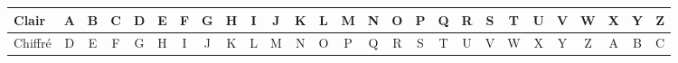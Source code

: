 
\begin{tabular}{l|c|c|c|c|c|c|c|c|c|c|c|c|c|c|c|c|c|c|c|c|c|c|c|c|c|c}
Clair	&A	&B	&C	&D	&E	&F	&G	&H	&I	&J	&K	&L	&M	&N	&O	&P	&Q	&R	&S	&T	&U	&V	&W	&X	&Y	&Z\\
\hline
Chiffré	&D	&E	&F	&G	&H	&I	&J	&K	&L	&M	&N	&O	&P	&Q	&R	&S	&T	&U	&V	&W	&X	&Y	&Z	&A	&B	&C\\
\end{tabular}
